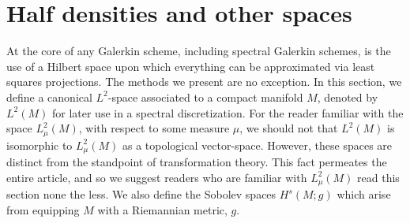 \documentclass[final,leqno]{siamart}
\begin{document}


\section{Half densities and other spaces}
\label{sec:half densities}

At the core of any Galerkin scheme, including spectral Galerkin schemes, is the use of a Hilbert space upon which everything can be approximated via least squares projections.
The methods we present are no exception.
In this section, we define a canonical $L^{2}$-space associated to a compact manifold $M$, denoted by $L^{2}(M)$ for later use in a spectral discretization.
For the reader familiar with the space $L^{2}_{\mu}(M)$, with respect to some measure $\mu$, we should not that $L^{2}(M)$ is isomorphic to $L^{2}_{\mu}(M)$ as a topological vector-space.
However, these spaces are distinct from the standpoint of transformation theory.
This fact permeates the entire article, and so we suggest readers who are familiar with $L^{2}_{\mu}(M)$ read this section none the less.
We also define the Sobolev spaces $H^{s}(M ; g)$ which arise from equipping $M$ with a Riemannian metric, $g$.
\end{document}
